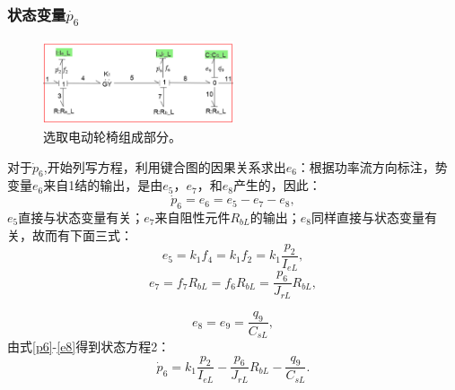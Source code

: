 \subsubsection{状态变量$\dot{ p_6 }$}
\begin{figure}[H]
	\centering
	\includegraphics[width=0.5\textwidth]{fig/equation2.png}
	\caption{选取电动轮椅组成部分。}\label{fig:equation2}
\end{figure}
对于$\dot{p} _ { 6 }$,开始列写方程，利用键合图的因果关系求出$e_6$：根据功率流方向标注，势变量$e_6$来自1结的输出，是由$e_5$，$e_7$，和$e_8$产生的，因此：
\begin{equation}\label{p6}
\dot{ p } _ { 6 } = e _ { 6 } = e _ { 5 } - e _ { 7 } - e _ { 8 },
\end{equation}
$e_5$直接与状态变量有关；$e_7$来自阻性元件$R _ { bL }$的输出；$e_8$同样直接与状态变量有关，故而有下面三式：
\begin{equation}
e _ { 5 } = k _ { 1 } f _ { 4 } = k _ { 1 } f _ { 2 } = k _ { 1 } \frac { p _ { 2 } } { I _ { eL }  },
\end{equation}
\begin{equation}
e _ { 7 } = f _ { 7 } R _ { bL }  = f _ { 6 } R _ { b L }  = \frac { p _ { 6 } } { J _ { rL }  } R _ { bL} ,
\end{equation}

\begin{equation}\label{e8}
e _ { 8 } = e _ { 9 } = \frac { q _ { 9 } } { C _ { s L}  } ,
\end{equation}
由式\ref{p6}-\ref{e8}得到状态方程2：
\begin{equation}
\dot{ p } _ { 6 } = k _ { 1 } \frac { p _ { 2 } } { I _ { e L }  } - \frac { p_ { 6 } } { J _ { rL}  } R _ { bL}  - \frac { q _ { 9 } } { C _ { sL }  }.
\end{equation}
